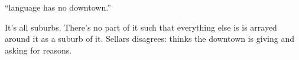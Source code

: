 ``language has no downtown.''

It's all suburbs. There's no part of it such that everything else is is arrayed around it as a suburb of it. Sellars disagrees: thinks the downtown is giving and asking for reasons.